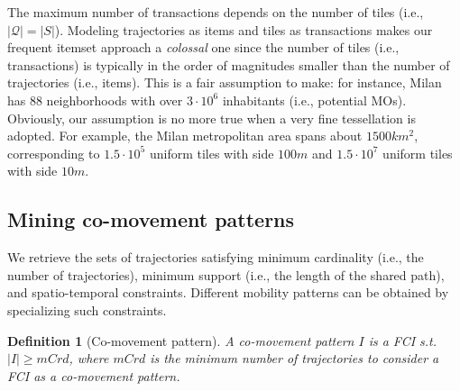 \documentclass[
]{ceurart}
\newtheorem{definition}{Definition}
\begin{document}
The maximum number of transactions depends on the number of tiles (i.e., $|\mathcal{Q}| = |S|$).
Modeling trajectories as items and tiles as transactions makes our frequent itemset approach a \textit{colossal} one since the number of tiles (i.e., transactions) is typically in the order of magnitudes smaller than the number of trajectories (i.e., items). 
This is a fair assumption to make: for instance, Milan has 88 neighborhoods with over $3 \cdot 10^6$ inhabitants (i.e., potential MOs). 
Obviously, our assumption is no more true when a very fine tessellation is adopted.
For example, the Milan metropolitan area spans about $1500km^2$, corresponding to $1.5\cdot10^5$ uniform tiles with side $100m$ and $1.5\cdot10^7$ uniform tiles with side $10m$.

\subsection{Mining co-movement patterns}
We retrieve the sets of trajectories satisfying minimum cardinality (i.e., the number of trajectories), minimum support (i.e., the length of the shared path), and spatio-temporal constraints.
Different mobility patterns can be obtained by specializing such constraints.%

\begin{definition}[Co-movement pattern]\label{def:comov}
A \textit{co-movement pattern} $I$ is a FCI s.t. $|I| \ge mCrd$, where $mCrd$ is the minimum number of trajectories to consider a FCI as a co-movement pattern.
\end{definition}
\end{document}
